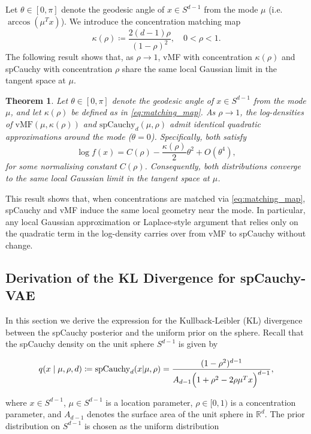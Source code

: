 \documentclass{article}
\newtheorem{theorem}{Theorem}
\begin{document}
Let $\theta \in [0,\pi]$ denote the geodesic angle of $x \in S^{d-1}$ from the mode
$\mu$ (i.e. $\arccos(\mu^T x)$). We introduce the concentration matching map
\begin{equation}\label{eq:matching_map}
  \kappa(\rho) \coloneq \frac{2(d-1)\rho}{(1-\rho)^2}, \quad 0 < \rho < 1.
\end{equation}
The following result shows that, as $\rho \to 1$, vMF with concentration
$\kappa(\rho)$ and spCauchy with concentration $\rho$ share the same local Gaussian
limit in the tangent space at $\mu$.

\begin{theorem}\label{thm:vmf-spcauchy-equivalence}
Let $\theta \in [0,\pi]$ denote the geodesic angle of $x \in S^{d-1}$ from the mode
$\mu$, and let $\kappa(\rho)$ be defined as in \eqref{eq:matching_map}.
As $\rho \to 1$, the log-densities of $\mathrm{vMF}(\mu, \kappa(\rho))$ and
$\mathrm{spCauchy}_d(\mu, \rho)$ admit identical quadratic approximations around the
mode ($\theta = 0$). Specifically, both satisfy
\[
  \log f(x) = C(\rho) - \frac{\kappa(\rho)}{2}\theta^2 + O(\theta^4),
\]
for some normalising constant $C(\rho)$.
Consequently, both distributions converge to the same local Gaussian limit in the
tangent space at $\mu$.
\end{theorem}

This result shows that, when concentrations are matched via \eqref{eq:matching_map},
spCauchy and vMF induce the same local geometry near the mode. In particular, any
local Gaussian approximation or Laplace-style argument that relies only on the
quadratic term in the log-density carries over from vMF to spCauchy without change.


\subsection{Derivation of the KL Divergence for spCauchy-VAE}\label{KL}

In this section we derive the expression for the Kullback-Leibler (KL) divergence between the spCauchy posterior and the uniform prior on the sphere. Recall that the spCauchy density on the unit sphere \(S^{d-1}\) is given by

\[
q(x \mid \mu, \rho, d) \coloneq \mathrm{spCauchy}_d(x | \mu, \rho) =\frac{(1-\rho^2)^{d-1}}{A_{d-1}\Bigl(1+\rho^2-2\rho\mu^T x\Bigr)^{d-1}},
\]

where \(x\in S^{d-1}\), \(\mu\in S^{d-1}\) is a location parameter, \(\rho\in [0,1)\) is a concentration parameter, and \(A_{d-1}\) denotes the surface area of the unit sphere in \(\mathbb{R}^d\). The prior distribution on \(S^{d-1}\) is chosen as the uniform distribution
\end{document}
